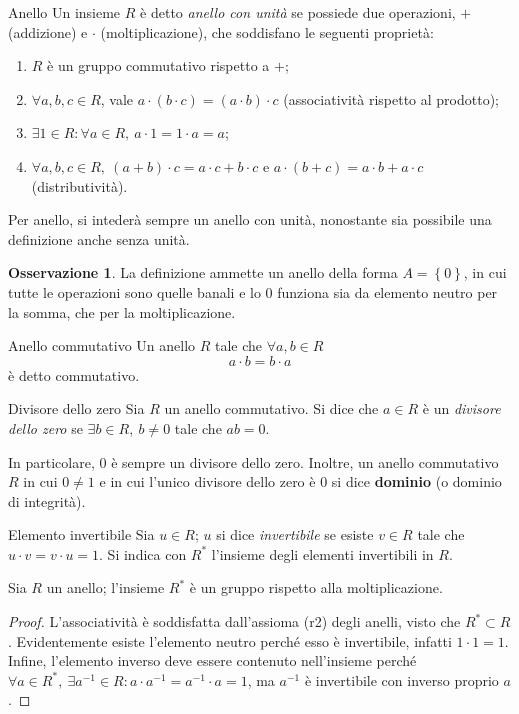 \documentclass[11pt, a4paper]{scrartcl}
\theoremstyle{definition}
\numberwithin{esempio}{section}
\theoremstyle{definition}
\newtheorem{obs}{Osservazione}
\numberwithin{obs}{section}
\numberwithin{nota}{section}
\numberwithin{equation}{subsection}
\begin{document}
\begin{definizione}
	{Anello}{}
	Un insieme $R$ \`e detto \textit{anello con unit\`a} se possiede due operazioni, $+$ (addizione) e $\cdot $ (moltiplicazione), che soddisfano le seguenti propriet\`a:
	\begin{enumerate}[(r1).]
		\item $R$ \`e un gruppo commutativo rispetto a $+$;
		\item $\forall a,b,c \in R$, vale $a \cdot ( b\cdot c) = (a\cdot b) \cdot c$ (associativit\`a rispetto al prodotto);
		\item $\exists 1 \in R  : \forall a \in R, \ a \cdot 1 = 1 \cdot a = a $;
		\item $\forall a,b,c \in R, \ (a+b) \cdot c = a \cdot c + b \cdot  c$ e $a \cdot (b + c) = a \cdot b + a \cdot  c$ (distributivit\`a).
	\end{enumerate}
	Per anello, si inteder\`a sempre un anello con unit\`a, nonostante sia possibile una definizione anche senza unit\`a.	
\end{definizione}
\begin{obs}
	La definizione ammette un anello della forma $A = \left\{ 0 \right\} $, in cui tutte le operazioni sono quelle banali e lo $0$ funziona sia da elemento neutro per la somma, che per la moltiplicazione.
\end{obs}
\begin{definizione}
	{Anello commutativo}{}
	Un anello $R$ tale che $\forall a,b \in R$
	\[
	a \cdot b = b \cdot a 
	\] 
	\`e detto commutativo.
\end{definizione}
\begin{definizione}
	{Divisore dello zero}{}
	Sia $R$ un anello commutativo. 
	Si dice che $ a \in R$ \`e un \textit{divisore dello zero} se $\exists b \in R, \ b\neq 0$ tale che $ab = 0$.
\end{definizione}
\noindent In particolare, $0$ \`e sempre un divisore dello zero.
Inoltre, un anello commutativo $R$ in cui $0\neq 1$ e in cui l'unico divisore dello zero \`e $0$ si dice \textbf{dominio} (o dominio di integrit\`a).
\begin{definizione}
	{Elemento invertibile}{}
	Sia $u \in R$; $u$ si dice \textit{invertibile} se esiste $v \in R$ tale che $u\cdot  v = v \cdot u = 1$.
	Si indica con $R^*$ l'insieme degli elementi invertibili in $R$.
\end{definizione}
\begin{prop}
	{}{}	
	Sia $R$ un anello; l'insieme $R^*$ \`e un gruppo rispetto alla moltiplicazione.
	\begin{proof}
		L'associativit\`a \`e soddisfatta dall'assioma (r2) degli anelli, visto che $R^* \subset R$.
		Evidentemente esiste l'elemento neutro perch\'e esso \`e invertibile, infatti $1 \cdot 1 = 1$.
		Infine, l'elemento inverso deve essere contenuto nell'insieme perch\'e $\forall a \in R^*, \ \exists a^{-1}  \in R : a\cdot a^{-1} = a^{-1} \cdot a = 1$, ma $a^{-1} $ \`e invertibile con inverso proprio $a$.
	\end{proof}
\end{prop}
\end{document}
